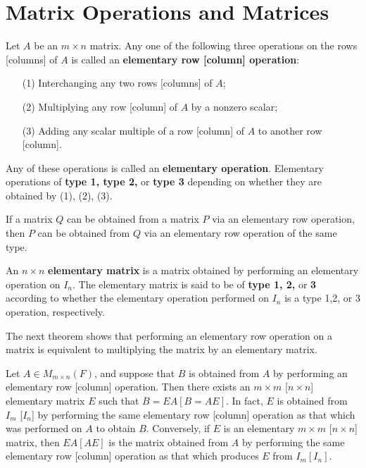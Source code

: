 \section{Matrix Operations and Matrices}

\begin{definition}
    Let \( A  \) be an \( m \times n  \) matrix. Any one of the following three operations on the rows [columns] of \( A  \) is called an \textbf{elementary row [column] operation}:
    \begin{enumerate}
        \item[(1)] Interchanging any two rows [columns] of \( A \);
        \item[(2)] Multiplying any row [column] of \( A  \) by a nonzero scalar;
        \item[(3)] Adding any scalar multiple of a row [column] of \( A  \) to another row [column].
    \end{enumerate}
    Any of these operations is called an \textbf{elementary operation}. Elementary operations of \textbf{type 1, type 2,} or \textbf{type 3} depending on whether they are obtained by (1), (2), (3).
\end{definition}

If a matrix \( Q  \) can be obtained from a matrix \( P  \) via an elementary row operation, then \( P  \) can be obtained from \( Q  \) via an elementary row operation of the same type.

\begin{definition}
    An \( n \times n  \) \textbf{elementary matrix} is a matrix obtained by performing an elementary operation on \( {I}_{n} \). The elementary matrix is said to be of \textbf{type 1, 2,} or \textbf{3} according to whether the elementary operation performed on \( {I}_{n} \) is a type 1,2, or 3 operation, respectively.
\end{definition}

The next theorem shows that performing an elementary row operation on a matrix is equivalent to multiplying the matrix by an elementary matrix.

\begin{theorem}
    Let \( A \in {M}_{m \times n}(F)  \), and suppose that \( B  \) is obtained from \( A  \) by performing an elementary row [column] operation. Then there exists an \( m \times m  \) [\( n \times n \)] elementary matrix \( E  \) such that \(  B = EA [B = AE] \). In fact, \( E  \) is obtained from \( {I}_{m}  \) [\( {I}_{n} \)] by performing the same elementary row [column] operation as that which was performed on \( A  \) to obtain \( B \). Conversely, if \( E \) is an elementary \( m \times m  \) [\( n \times n \)] matrix, then \( EA [AE]  \) is the matrix obtained from \( A  \) by performing the same elementary row [column] operation as that which produces \( E  \) from \( {I}_{m} [{I}_{n}]  \). 
\end{theorem}

